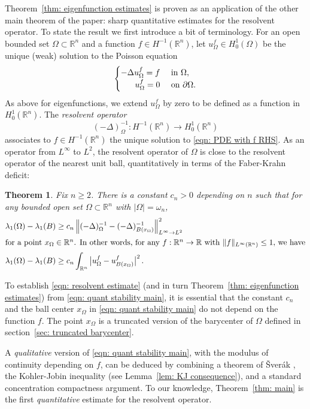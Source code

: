 \documentclass[10pt,a4paper]{amsart}
\numberwithin{equation}{section}
\newtheorem{theorem}{Theorem}[section]
\def\R{{\mathbb R}}
\def\W{\Omega}
\begin{document}
Theorem~\ref{thm: eigenfunction estimates} is proven as an application of the other main theorem of the paper: sharp  quantitative estimates for the resolvent operator. To state the result we first introduce a bit of terminology. For an open bounded set $\W \subset \R^n$ and a function $f \in H^{-1}(\R^n)$, let $u_{\W}^f  \in H^{1}_0(\W)$ be the unique (weak) solution to the Poisson equation 
\begin{equation}\label{eqn: PDE with f RHS}
	\begin{cases}
	\hfill	-\Delta u^f_{\W}  = f & \text{ in } \W,\\
	\hfill	u_{\W}^f =0 & \text{ on } \partial \W.
	\end{cases}
\end{equation}
As above for eigenfunctions, we extend $u_\W^f$ by zero to be defined as a function in $H^1_0(\R^n)$. The {\it resolvent operator}
$$(-\Delta)_\W^{-1} : H^{-1}(\R^n) \to H^1_0(\R^n)$$ associates to $f \in H^{-1}(\R^n)$ the unique solution to \eqref{eqn: PDE with f RHS}. As an operator from $L^{\infty}$ to $L^2$, the resolvent operator of $\W$ is close to the resolvent operator of the nearest unit ball, quantitatively in terms of the Faber-Krahn deficit:
\begin{theorem}\label{thm: resolvent}\label{thm: main}
Fix $n\geq 2$. There is a constant $c_{n}>0$ depending on $n$ such that  for any bounded open set $\W \subset \R^n$ with $|\W| = \omega_n$,
\begin{align}
    \label{eqn: resolvent estimate}
  \lambda_1(\W ) - \lambda_1(B)  & \geq c_{n} \left\| (-\Delta)_{\W}^{-1} -(-\Delta)_{B(x_\W)}^{-1}\right\|^2_{L^{\infty}\to L^2}\,\\
\intertext{for a point $x_\W \in \R^n$. In other words, for any $f:\R^n \to \R$ with $\|f\|_{L^{\infty}(\R^n)}\leq 1,$ we have}
\label{eqn: quant stability main}
 \lambda_1(\W ) - \lambda_1(B)  & \geq c_{n}\int_{\R^n} \big|u_{\W}^f - u_{B(x_\W)}^f\big|^2 \,.   
\end{align}
\end{theorem}
To establish \eqref{eqn: resolvent estimate} (and in turn Theorem~\ref{thm: eigenfunction estimates}) from \eqref{eqn: quant stability main}, it is essential that the constant $c_{n}$ and the ball center  $x_\W$ in \eqref{eqn: quant stability main} do not depend on the function $f$. The point $x_\W$  is a truncated version of the barycenter of $\W$ defined  in section~\ref{sec: truncated barycenter}. 


A {\it  qualitative} version of \eqref{eqn: quant stability main}, with the modulus of continuity depending on $f$, can be deduced by combining a theorem of \v{S}ver\'{a}k  \cite[Theorem 3.2.5]{hp18}, the Kohler-Jobin inequality (see Lemma~\ref{lem: KJ consequence}), and a standard concentration compactness argument. To our knowledge, Theorem~\ref{thm: main} is the first {\it quantitative} estimate for the  resolvent operator.
\end{document}
